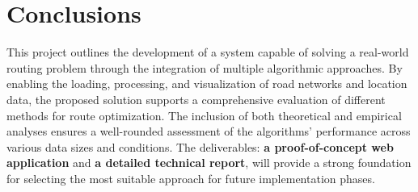\documentclass[11pt]{article}
\begin{document}
\section{Conclusions}

This project outlines the development of a system capable of solving a real-world routing problem through the integration of multiple algorithmic approaches. By enabling the loading, processing, and visualization of road networks and location data, the proposed solution supports a comprehensive evaluation of different methods for route optimization. The inclusion of both theoretical and empirical analyses ensures a well-rounded assessment of the algorithms’ performance across various data sizes and conditions. The deliverables: \textbf{a proof-of-concept web application} and \textbf{a detailed technical report}, will provide a strong foundation for selecting the most suitable approach for future implementation phases.






\end{document}
